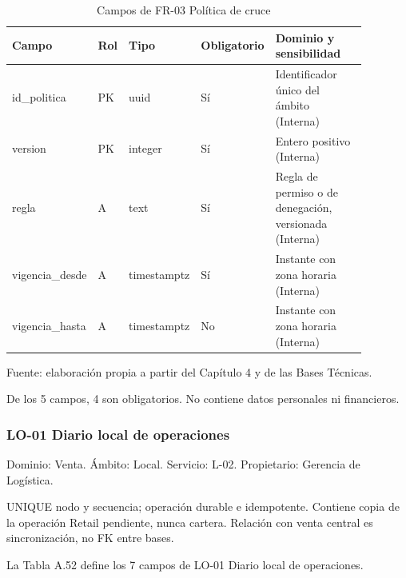 \documentclass[11pt]{article}
\begin{document}
\begin{table}[htbp]
\caption{Campos de FR-03 Política de cruce}\label{tab:d_fr03}
\centering
\begin{tabular}{@{}p{0.167\linewidth}p{0.070\linewidth}p{0.079\linewidth}p{0.097\linewidth}p{0.465\linewidth}@{}}
\toprule Campo & Rol & Tipo & Obligatorio & Dominio y sensibilidad \\
\midrule
id\_politica & PK & uuid & Sí & Identificador único del ámbito (Interna) \\
version & PK & integer & Sí & Entero positivo (Interna) \\
regla & A & text & Sí & Regla de permiso o de denegación, versionada (Interna) \\
vigencia\_desde & A & timestamptz & Sí & Instante con zona horaria (Interna) \\
vigencia\_hasta & A & timestamptz & No & Instante con zona horaria (Interna) \\
\bottomrule
\end{tabular}
\par\smallskip
{\raggedright Fuente: elaboración propia a partir del Capítulo 4 y de las Bases Técnicas.\par}
\end{table}


De los 5 campos, 4 son obligatorios. No contiene datos personales ni financieros.

\subsubsection{LO-01 Diario local de operaciones}

Dominio: Venta. Ámbito: Local. Servicio: L-02. Propietario: Gerencia de Logística.

UNIQUE nodo y secuencia; operación durable e idempotente. Contiene copia de la operación Retail pendiente, nunca cartera. Relación con venta central es sincronización, no FK entre bases.

La Tabla A.52 define los 7 campos de LO-01 Diario local de operaciones.
\end{document}
